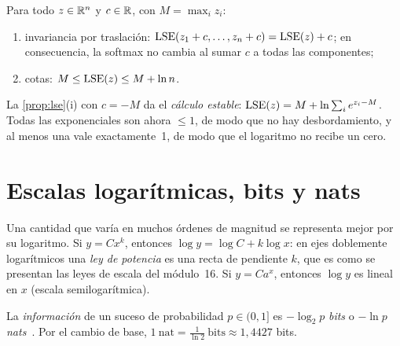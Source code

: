 \begin{proposicion}\label{prop:lse}
Para todo $z\in\mathbb{R}^n$ y $c\in\mathbb{R}$, con $M=\max_iz_i$:
\begin{enumerate}
  \item invariancia por traslación: $\operatorname{LSE}(z_1+c,\dots,z_n+c)=\operatorname{LSE}(z)+c$; en consecuencia, la softmax no cambia al sumar $c$ a todas las componentes;
  \item cotas: $M\le\operatorname{LSE}(z)\le M+\ln n$.
\end{enumerate}
\end{proposicion}

La \cref{prop:lse}(i) con $c=-M$ da el \emph{cálculo estable}: $\operatorname{LSE}(z)=M+\ln\sum_ie^{z_i-M}$. Todas las exponenciales son ahora $\le1$, de modo que no hay desbordamiento, y al menos una vale exactamente~1, de modo que el logaritmo no recibe un cero.

\addtocounter{definicion}{1}%

\section{Escalas logarítmicas, bits y nats}

Una cantidad que varía en muchos órdenes de magnitud se representa mejor por su logaritmo. Si $y=Cx^{k}$, entonces $\log y=\log C+k\log x$: en ejes doblemente logarítmicos una \emph{ley de potencia} es una recta de pendiente $k$, que es como se presentan las leyes de escala del módulo~16. Si $y=Ca^{x}$, entonces $\log y$ es lineal en $x$ (escala semilogarítmica).

\begin{definicion}
La \emph{información} de un suceso de probabilidad $p\in(0,1]$ es $-\log_2p$ \emph{bits} o $-\ln p$ \emph{nats}~\cite[cap.~2]{ct}. Por el cambio de base, $1\ \text{nat}=\frac1{\ln2}\ \text{bits}\approx1{,}4427$ bits.
\end{definicion}

\addtocounter{definicion}{1}%

\addtocounter{definicion}{1}%

\addtocounter{definicion}{1}%

